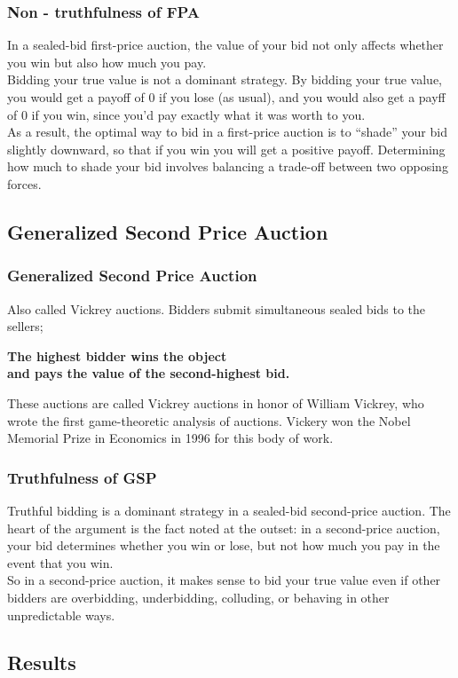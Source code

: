 \documentclass{beamer}
\begin{document}
\begin{frame}
\frametitle{Non - truthfulness of FPA}
In a sealed-bid first-price auction, the value of your bid not only affects whether you win but also how much you pay.\\
\medskip
Bidding your true value is not a dominant strategy. By bidding your true value, you would get a payoff of 0 if you lose (as usual), and you would also get a payff of 0 if you win, since you’d pay exactly what it was worth to you.\\
\medskip
As a result, the optimal way to bid in a first-price auction is to “shade” your bid slightly downward, so that if you win you will get a positive payoff. Determining how much to shade your bid involves balancing a trade-off between two opposing forces.
\end{frame}

\subsection{Generalized Second Price Auction}
\begin{frame}
\frametitle{Generalized Second Price Auction}
Also called Vickrey auctions. Bidders submit simultaneous sealed bids to the sellers;
\begin{center} 
\textbf{The highest bidder wins the object \\
and pays the value of the second-highest bid.} 
\end{center}
These auctions are called Vickrey auctions in honor of William Vickrey, who wrote the first game-theoretic analysis of auctions. Vickery won the Nobel Memorial Prize in Economics in 1996 for this body of work.
\end{frame}

\begin{frame}
\frametitle{Truthfulness of GSP}
Truthful bidding is a dominant strategy in a sealed-bid second-price auction. The heart of the argument is the fact noted at the outset: in a second-price auction, your bid determines whether you win or lose, but not how much you pay in the event that you win. \\
\medskip
So in a second-price auction, it makes sense to bid your true value even if other bidders are overbidding, underbidding, colluding, or behaving in other unpredictable ways.
\end{frame}

\subsection{Results}
\end{document}
